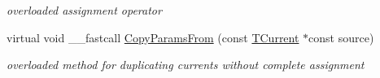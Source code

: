 \begin{DoxyCompactItemize}
\begin{DoxyCompactList}\small\item\em overloaded assignment operator \end{DoxyCompactList}\item 
\hypertarget{class_t_h_h_current_a3461a18c4cce4cfc3108791184bf7d3e}{virtual void \+\_\+\+\_\+fastcall \hyperlink{class_t_h_h_current_a3461a18c4cce4cfc3108791184bf7d3e}{Copy\+Params\+From} (const \hyperlink{class_t_current}{T\+Current} $\ast$const source)}\label{class_t_h_h_current_a3461a18c4cce4cfc3108791184bf7d3e}

\begin{DoxyCompactList}\small\item\em overloaded method for duplicating currents without complete assignment \end{DoxyCompactList}\end{DoxyCompactItemize}
